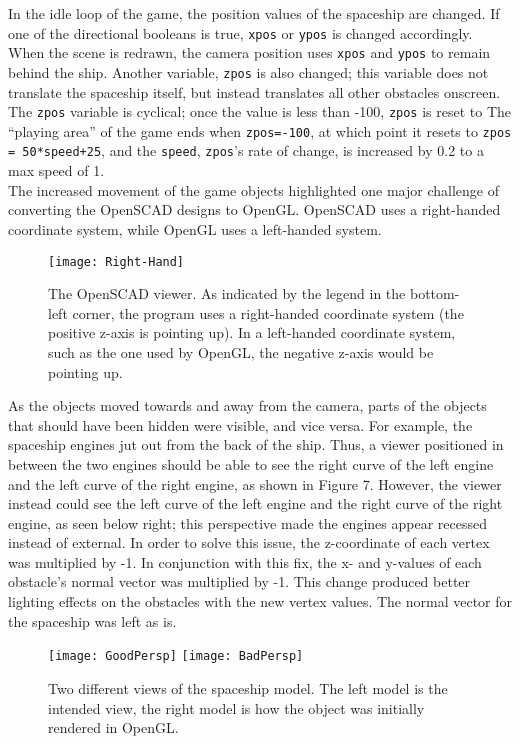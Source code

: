 \documentclass[12pt]{article}
\begin{document}
\begin{doublespace}
In the idle loop of the game, the position values of the spaceship are changed. If one of the directional booleans is true, \texttt{xpos} or \texttt{ypos} is changed accordingly. When the scene is redrawn, the camera position uses \texttt{xpos} and \texttt{ypos} to remain behind the ship. Another variable, \texttt{zpos} is also changed; this variable does not translate the spaceship itself, but instead translates all other obstacles onscreen. The \texttt{zpos} variable is cyclical; once the value is less than -100, \texttt{zpos} is reset to The ``playing area'' of the game ends when \texttt{zpos=-100}, at which point it resets to \texttt{zpos = 50*speed+25}, and the \texttt{speed}, \texttt{zpos}'s rate of change, is increased by 0.2 to a max speed of 1.\\

The increased movement of the game objects highlighted one major challenge of converting the OpenSCAD designs to OpenGL. OpenSCAD uses a right-handed coordinate system, while OpenGL uses a left-handed system.
\begin{figure}[h]
  \texttt{[image: Right-Hand]}
  \centering
  \caption{The OpenSCAD viewer. As indicated by the legend in the bottom-left corner, the program uses a right-handed coordinate system (the positive z-axis is pointing up). In a left-handed coordinate system, such as the one used by OpenGL, the negative z-axis would be pointing up.}
\end{figure}
As the objects moved towards and away from the camera, parts of the objects that should have been hidden were visible, and vice versa. For example, the spaceship engines jut out from the back of the ship. Thus, a viewer positioned in between the two engines should be able to see the right curve of the left engine and the left curve of the right engine, as shown in Figure 7. However, the viewer instead could see the left curve of the left engine and the right curve of the right engine, as seen below right; this perspective made the engines appear recessed instead of external. In order to solve this issue, the z-coordinate of each vertex was multiplied by -1. In conjunction with this fix, the x- and y-values of each obstacle's normal vector was multiplied by -1. This change produced better lighting effects on the obstacles with the new vertex values. The normal vector for the spaceship was left as is.
\begin{figure}[h]
  \texttt{[image: GoodPersp]}
  \texttt{[image: BadPersp]}
  \centering
  \caption{Two different views of the spaceship model. The left model is the intended view, the right model is how the object was initially rendered in OpenGL.}
\end{figure}


\end{doublespace}
\end{document}
